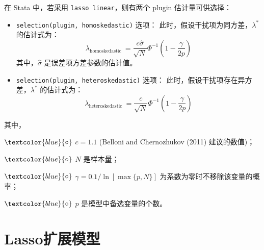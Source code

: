 

在 Stata 中，若采用 \texttt{lasso linear}，则有两个 plugin 估计量可供选择：
\begin{itemize}
\item \texttt{selection(plugin, homoskedastic)} 选项：
此时，假设干扰项为同方差，$\lambda^*$ 的估计式为：
\begin{equation}\label{eq:lasso-plugin-01}
	\lambda_{\text {homoskedastic }}=\frac{c \widehat{\sigma}}{\sqrt{N}} \Phi^{-1}\left(1-\frac{\gamma}{2 p}\right)
\end{equation}
其中，$\widehat{\sigma}$ 是误差项方差参数的估计值。
\item \texttt{selection(plugin, heteroskedastic)} 选项：
此时，假设干扰项存在异方差，$\lambda^*$ 的估计式为：
\begin{equation}\label{eq:lasso-plugin-02}
\lambda_{\text {heteroskedastic }}=\frac{c}{\sqrt{N}} \Phi^{-1}\left(1-\frac{\gamma}{2 p}\right)
\end{equation}
\end{itemize}
其中，

$\textcolor{blue}{\circ}$ $c=1.1$ (Belloni and Chernozhukov (2011) 建议的数值)；

$\textcolor{blue}{\circ}$ $N$ 是样本量；

$\textcolor{blue}{\circ}$ $\gamma=0.1 / \ln [\max \{p, N\}]$ 为系数为零时不移除该变量的概率；

$\textcolor{blue}{\circ}$ $p$ 是模型中备选变量的个数。

\vspace{5pt}





\section{Lasso扩展模型}

